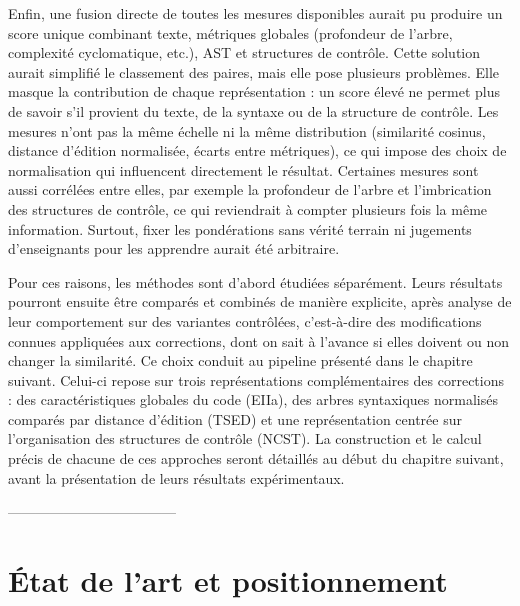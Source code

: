 Enfin, une fusion directe de toutes les mesures disponibles aurait pu produire
un score unique combinant texte, métriques globales (profondeur de l'arbre,
complexité cyclomatique, etc.), AST et structures de contrôle. Cette solution
aurait simplifié le classement des paires, mais elle pose plusieurs
problèmes. Elle masque la contribution de chaque représentation : un score
élevé ne permet plus de savoir s'il provient du texte, de la syntaxe ou de la
structure de contrôle. Les mesures n'ont pas la même échelle ni la même
distribution (similarité cosinus, distance d'édition normalisée, écarts entre
métriques), ce qui impose des choix de normalisation qui influencent
directement le résultat. Certaines mesures sont aussi corrélées entre elles,
par exemple la profondeur de l'arbre et l'imbrication des structures de
contrôle, ce qui reviendrait à compter plusieurs fois la même information.
Surtout, fixer les pondérations sans vérité terrain ni jugements
d'enseignants pour les apprendre aurait été arbitraire.

Pour ces raisons, les méthodes sont d'abord étudiées séparément. Leurs
résultats pourront ensuite être comparés et combinés de manière explicite,
après analyse de leur comportement sur des variantes contrôlées, c'est-à-dire
des modifications connues appliquées aux corrections, dont on sait à l'avance
si elles doivent ou non changer la similarité. Ce choix conduit au pipeline
présenté dans le chapitre suivant. Celui-ci repose sur trois représentations
complémentaires des corrections : des caractéristiques globales du code
(EIIa), des arbres syntaxiques normalisés comparés par distance d'édition
(TSED) et une représentation centrée sur l'organisation des structures de
contrôle (NCST). La construction et le calcul précis de chacune de ces
approches seront détaillés au début du chapitre suivant, avant la
présentation de leurs résultats expérimentaux.


------------------------------------




\chapter{État de l'art et positionnement}
\label{chap:etat-art}

